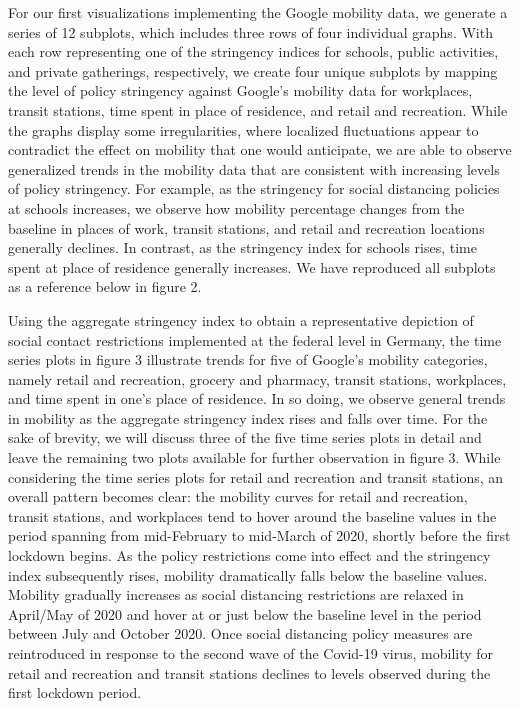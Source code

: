 For our first visualizations implementing the Google mobility data, we generate a series of 12 subplots, which includes three rows of four individual graphs. With each row representing one of the stringency indices for schools, public activities, and private gatherings, respectively, we create four unique subplots by mapping the level of policy stringency against Google’s mobility data for workplaces, transit stations, time spent in place of residence, and retail and recreation. While the graphs display some irregularities, where localized fluctuations appear to contradict the effect on mobility that one would anticipate, we are able to observe generalized trends in the mobility data that are consistent with increasing levels of policy stringency. For example, as the stringency for social distancing policies at schools increases, we observe how mobility percentage changes from the baseline in places of work, transit stations, and retail and recreation locations generally declines. In contrast, as the stringency index for schools rises, time spent at place of residence generally increases. We have reproduced all subplots as a reference below in figure 2. 

Using the aggregate stringency index to obtain a representative depiction of social contact restrictions implemented at the federal level in Germany, the time series plots in figure 3 illustrate trends for five of Google’s mobility categories, namely retail and recreation, grocery and pharmacy, transit stations, workplaces, and time spent in one’s place of residence. In so doing, we observe general trends in mobility as the aggregate stringency index rises and falls over time. For the sake of brevity, we will discuss three of the five time series plots in detail and leave the remaining two plots available for further observation in figure 3. While considering the time series plots for retail and recreation and transit stations, an overall pattern becomes clear: the mobility curves for retail and recreation, transit stations, and workplaces tend to hover around the baseline values in the period spanning from mid-February to mid-March of 2020, shortly before the first lockdown begins. As the policy restrictions come into effect and the stringency index subsequently rises, mobility dramatically falls below the baseline values. Mobility gradually increases as social distancing restrictions are relaxed in April/May of 2020 and hover at or just below the baseline level in the period between July and October 2020. Once social distancing policy measures are reintroduced in response to the second wave of the Covid-19 virus, mobility for retail and recreation and transit stations declines to levels observed during the first lockdown period. 

